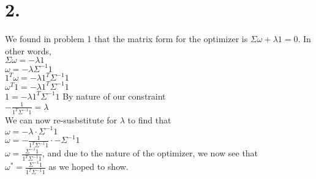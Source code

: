 \documentclass{article}
\begin{document}
\section*{2.}
{\Large

We found in problem 1 that the matrix form for the optimizer is $\Sigma \omega + \lambda 1 = 0$. In other words, \\
$\Sigma \omega = -\lambda1$ \\
$\omega = -\lambda\Sigma^{-1}1$ \\
$1^T\omega = -\lambda1^T\Sigma^{-1}1$ \\
$\omega^T1 = -\lambda1^T\Sigma^{-1}1$ \\
$1 = -\lambda1^T\Sigma^{-1}1$ \hfill By nature of our constraint \\
$-\frac{1}{1^T\Sigma^{-1}1} = \lambda$ \\ 
We can now re-susbstitute for $\lambda$ to find that \\ 
$\omega = -\lambda \cdot \Sigma^{-1}1$ \\
$\omega = -\frac{1}{1^T\Sigma^{-1}1} \cdot -\Sigma^{-1}1$ \\ 
$\omega = \frac{\Sigma^{-1}1}{1^T\Sigma^{-1}1}$, and due to the nature of the optimizer, we now see that \\
$\omega^* = \frac{\Sigma^{-1}1}{1^T\Sigma^{-1}1}$ 
as we hoped to show.

}
\end{document}
